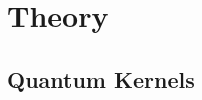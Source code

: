 \documentclass[reprint,amsfonts, amssymb, amsmath,  showkeys, nofootinbib,pra, superscriptaddress, twocolumn,longbibliography]{revtex4-2}
\begin{document}





\section{Theory}

\subsection{Quantum Kernels}
\end{document}
